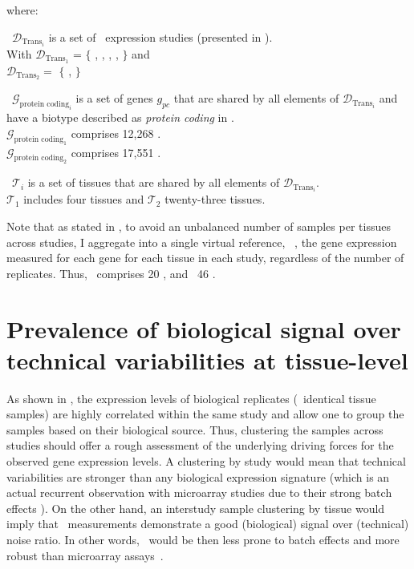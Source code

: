 where:
\quad\begin{eqlist}[\setlength{\itemsep}{0em}%
    \setlength{\topsep}{0em}%
    \setlength{\partopsep}{0em}%
    \setlength{\parskip}{0em}%
    \setlength{\parsep}{0em}]
    \item[\textbullet\ $\mathcal{D}_{\text{Trans}_i}$] is a set of
        \mRNA\ expression studies (presented in ).\\
        With $\mathcal{D}_{\text{Trans}_1}$ = $\{$ \castle, \brawand, \ibm,
        \uhlen, \gtex$\}$ and \\
        $\mathcal{D}_{\text{Trans}_2} =$ $\{$ \uhlen, \gtex$\}$
    \item[\textbullet\ $\mathcal{G}_{\text{protein coding}_i}$] is a set of
        genes $g_{pc}$ that are shared by all elements of
        $\mathcal{D}_{\text{Trans}_i}$ and\\
        have a biotype described as \emph{protein coding} in .\\
        $\mathcal{G}_{\text{protein coding}_1}$ comprises 12,268 \pcgs.\\
        $\mathcal{G}_{\text{protein coding}_2}$ comprises 17,551 \pcgs.
    \item[\textbullet\ $\mathcal{T}_i$] is a set of
        tissues that are shared by all elements of
        $\mathcal{D}_{\text{Trans}_i}$.\\
        $\mathcal{T}_1$ includes four tissues and
        $\mathcal{T}_2$ twenty-three tissues.
\end{eqlist}

Note that as stated in ,
to avoid an unbalanced number of samples per tissues across studies,
I aggregate into a single virtual reference, \ie\ \trep,
the gene expression measured for each gene for each tissue in each study,
regardless of the number of replicates.
Thus, \setOne\ comprises 20 \treps,
and \setTwo\ 46 \treps.


\section{Prevalence of biological signal over technical variabilities at
tissue-level}\label{sec:Trans_ReproExpresTissue}

As shown in ,
the expression levels of biological replicates (\ie\ identical tissue samples)
are highly correlated within the same study
and allow one to group the samples based on their biological source.
Thus, clustering the samples across studies should offer a rough assessment of
the underlying driving forces for the observed gene expression levels.
A clustering by study would mean that technical variabilities are stronger
than any biological expression signature
(which is an actual recurrent observation with microarray studies
due to their strong batch effects ).
On the other hand,
an interstudy sample clustering by tissue would imply that \Rnaseq\ measurements
demonstrate a good (biological) signal over (technical) noise ratio.
In other words,
\Rnaseq\ would be then less prone to batch effects and more robust than
microarray assays~.\mybr\

